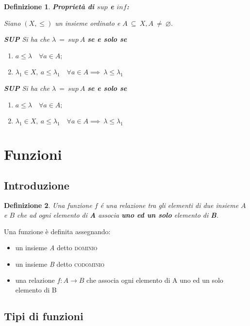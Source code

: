 \documentclass[12pt, a4paper]{article}
\theoremstyle{break}
\newtheorem{defn}{Definizione}
\theoremstyle{lemma}
\theoremstyle{lemma}
\theoremstyle{lemma}
\begin{document}
\begin{defn} \textbf{Proprietà di $sup$ e $inf$:}

		Siano $(X,\leq)$ un insieme ordinato e $A\ \subseteq\ X, A\ \neq\ \varnothing $.

                \textbf{SUP} Si ha che $\lambda\ =\ sup\ A$ \textbf{se e solo se}
		\begin{enumerate}
			\item $a \leq \lambda \quad \forall a \in A;$
			\item $\lambda_1 \in X,\ a \leq \lambda_1 \quad \forall a \in A \implies\  \lambda \leq \lambda_1$
		\end{enumerate}

                
                \textbf{SUP} Si ha che $\lambda\ =\ sup\ A$ \textbf{se e solo se}
		\begin{enumerate}
			\item $a \leq \lambda \quad \forall a \in A;$
			\item $\lambda_1 \in X,\ a \leq \lambda_1 \quad \forall a \in A \implies\  \lambda \leq \lambda_1$
		\end{enumerate}

\end{defn}

\section{Funzioni}

\subsection{Introduzione}

\begin{defn}
Una funzione $f$ é una relazione tra gli elementi di due insieme $A$ e $B$ che ad ogni elemento di \textbf{A} associa \textbf{uno ed un solo} elemento di \textbf{B}.
\end{defn}


Una funzione è definita assegnando:
\begin{itemize}
\item un insieme \textit{A} detto  \textsc{dominio}
\item un insieme \textit{B} detto \textsc{codominio}
\item una relazione $f: A \rightarrow B$ che associa ogni elemento di A uno ed un solo elemento di B
\end{itemize}


\subsection{Tipi di funzioni}
\end{document}
